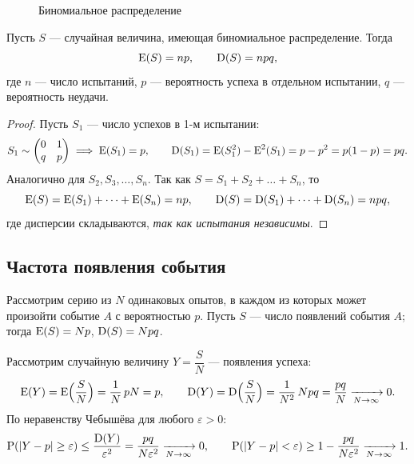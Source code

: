 \documentclass[11pt,a4paper]{article}
\begin{document}
\begin{figure}[H]
\centering
{}
\caption{Биномиальное распределение}
\end{figure}

\begin{teo}
Пусть $S$ — случайная величина, имеющая биномиальное распределение. Тогда
\[
\operatorname{E}(S)=np,\qquad \operatorname{D}(S)=npq,
\]
где $n$ — число испытаний, $p$ — вероятность успеха в отдельном испытании, $q$ — вероятность неудачи.
\end{teo}

\begin{proof}
Пусть $S_1$ — число успехов в 1-м испытании:
\[
S_1\sim\begin{pmatrix}0&1\\q&p\end{pmatrix}\;\Longrightarrow\;\operatorname{E}(S_1)=p,\qquad
\operatorname{D}(S_1)=\operatorname{E}(S_1^2)-\operatorname{E}^2(S_1)=p-p^2=p(1-p)=pq.
\]
Аналогично для $S_2,S_3,\dots,S_n$. Так как $S=S_1+S_2+\dots+S_n$, то
\[
\operatorname{E}(S)=\operatorname{E}(S_1)+\dots+\operatorname{E}(S_n)=np,\qquad \operatorname{D}(S)=\operatorname{D}(S_1)+\dots+\operatorname{D}(S_n)=npq,
\]
где дисперсии складываются, \emph{так как испытания независимы}.
\end{proof}

\subsection{Частота появления события}
Рассмотрим серию из $N$ одинаковых опытов, в каждом из которых может произойти событие $A$ с вероятностью $p$.
Пусть $S$ — число появлений события $A$; тогда $\operatorname{E}(S)=Np$, $\operatorname{D}(S)=Npq$.

Рассмотрим случайную величину $Y=\dfrac SN$ —  появления успеха:
\[
\operatorname{E}(Y)=\operatorname{E}\Bigl(\frac SN\Bigr)=\frac1N\,pN=p,\qquad
\operatorname{D}(Y)=\operatorname{D}\Bigl(\frac SN\Bigr)=\frac1{N^2}\,Npq=\frac{pq}{N}\xrightarrow[N\to\infty]{}0.
\]
По неравенству Чебышёва для любого $\varepsilon>0$:
\[
\operatorname{P}(|Y-p|\ge\varepsilon)\le\frac{\operatorname{D}(Y)}{\varepsilon^2}=\frac{pq}{N\varepsilon^2}\xrightarrow[N\to\infty]{}0,\qquad
\operatorname{P}(|Y-p|<\varepsilon)\ge1-\frac{pq}{N\varepsilon^2}\xrightarrow[N\to\infty]{}1.
\]
\end{document}
